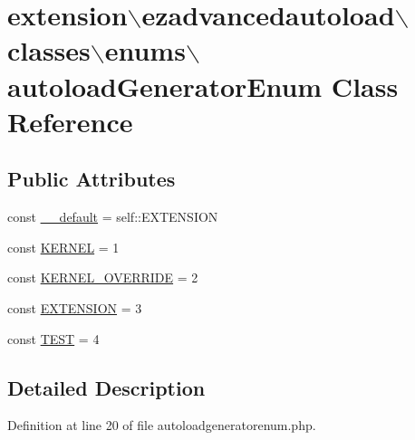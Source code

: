 \hypertarget{classextension_1_1ezadvancedautoload_1_1classes_1_1enums_1_1autoload_generator_enum}{\section{extension$\backslash$ezadvancedautoload$\backslash$classes$\backslash$enums$\backslash$autoload\-Generator\-Enum \-Class \-Reference}
\label{classextension_1_1ezadvancedautoload_1_1classes_1_1enums_1_1autoload_generator_enum}
}
\subsection*{\-Public \-Attributes}
\begin{DoxyCompactItemize}
\item 
const \hyperlink{classextension_1_1ezadvancedautoload_1_1classes_1_1enums_1_1autoload_generator_enum_a99b9d1e88c88539f6c95156361e2a73d}{\-\_\-\-\_\-default} = self\-::\-E\-X\-T\-E\-N\-S\-I\-O\-N
\item 
const \hyperlink{classextension_1_1ezadvancedautoload_1_1classes_1_1enums_1_1autoload_generator_enum_a44b3333041d23ed3ee6eab6966a2924e}{\-K\-E\-R\-N\-E\-L} = 1
\item 
const \hyperlink{classextension_1_1ezadvancedautoload_1_1classes_1_1enums_1_1autoload_generator_enum_a0e266fa17dcf002ce66239ce62a52c4f}{\-K\-E\-R\-N\-E\-L\-\_\-\-O\-V\-E\-R\-R\-I\-D\-E} = 2
\item 
const \hyperlink{classextension_1_1ezadvancedautoload_1_1classes_1_1enums_1_1autoload_generator_enum_af35752c8d16daa4d2f30d351c3575cb3}{\-E\-X\-T\-E\-N\-S\-I\-O\-N} = 3
\item 
const \hyperlink{classextension_1_1ezadvancedautoload_1_1classes_1_1enums_1_1autoload_generator_enum_a5ebe36a26a6f9d104d4d49dcdce0fbfe}{\-T\-E\-S\-T} = 4
\end{DoxyCompactItemize}


\subsection{\-Detailed \-Description}


\-Definition at line 20 of file autoloadgeneratorenum.\-php.




